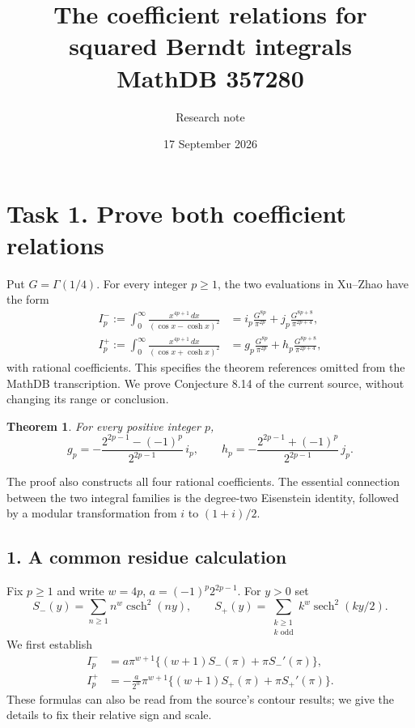 \documentclass[11pt]{article}
\title{The coefficient relations for squared Berndt integrals\\MathDB 357280}
\author{Research note}
\date{17 September 2026}
\newcommand{\sech}{\operatorname{sech}}
\newcommand{\csch}{\operatorname{csch}}
\newtheorem{theorem}{Theorem}
\begin{document}
\maketitle

\section*{Task 1. Prove both coefficient relations}
Put $G=\Gamma(1/4)$. For every integer $p\ge1$, the two evaluations
in Xu--Zhao \cite[Theorems 6.3 and 8.12]{XZ} have the form
\begin{align}
 I_p^-:=\int_0^\infty\frac{x^{4p+1}\,dx}{(\cos x-\cosh x)^2}
   &=i_p\frac{G^{8p}}{\pi^{2p}}
                  +j_p\frac{G^{8p+8}}{\pi^{2p+4}},\label{minus}\\
 I_p^+:=\int_0^\infty\frac{x^{4p+1}\,dx}{(\cos x+\cosh x)^2}
   &=g_p\frac{G^{8p}}{\pi^{2p}}
                  +h_p\frac{G^{8p+8}}{\pi^{2p+4}},\label{plus}
\end{align}
with rational coefficients. This specifies the theorem references
omitted from the MathDB transcription. We prove Conjecture 8.14
of the current source, without changing its range or conclusion.

\begin{theorem}
For every positive integer $p$,
\[
 \boxed{\displaystyle
 g_p=-\frac{2^{2p-1}-(-1)^p}{2^{2p-1}}\,i_p,
 \qquad
 h_p=-\frac{2^{2p-1}+(-1)^p}{2^{2p-1}}\,j_p.}
\]
\end{theorem}

The proof also constructs all four rational coefficients. The
essential connection between the two integral families is the
degree-two Eisenstein identity, followed by a modular transformation
from $i$ to $(1+i)/2$.

\subsection*{1. A common residue calculation}
Fix $p\ge1$ and write $w=4p$, $a=(-1)^p2^{2p-1}$. For $y>0$ set
\[
 S_-(y)=\sum_{n\ge1}n^w\csch^2(ny),\qquad
 S_+(y)=\sum_{\substack{k\ge1\\k\text{ odd}}}
                         k^w\sech^2(ky/2).
\]
We first establish
\begin{align}
 I_p^-&=a\pi^{w+1}\{(w+1)S_-(\pi)+\pi S_-'(\pi)\},\label{res-minus}\\
 I_p^+&=-\frac{a}{2^w}\pi^{w+1}
                    \{(w+1)S_+(\pi)+\pi S_+'(\pi)\}.
                    \label{res-plus}
\end{align}
These formulas can also be read from the source's contour results;
we give the details to fix their relative sign and scale.
\end{document}
